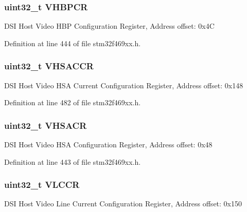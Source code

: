 \subsubsection[{\texorpdfstring{V\+H\+B\+P\+CR}{VHBPCR}}]{ uint32\+\_\+t V\+H\+B\+P\+CR}\hypertarget{struct_d_s_i___type_def_afb9fe674d72b1ec0d31697106b58b8b7}{}\label{struct_d_s_i___type_def_afb9fe674d72b1ec0d31697106b58b8b7}
D\+SI Host Video H\+BP Configuration Register, Address offset\+: 0x4C 

Definition at line 444 of file stm32f469xx.\+h.

\subsubsection[{\texorpdfstring{V\+H\+S\+A\+C\+CR}{VHSACCR}}]{ uint32\+\_\+t V\+H\+S\+A\+C\+CR}\hypertarget{struct_d_s_i___type_def_a66d476d7df8ef8e87d3da38a031567dd}{}\label{struct_d_s_i___type_def_a66d476d7df8ef8e87d3da38a031567dd}
D\+SI Host Video H\+SA Current Configuration Register, Address offset\+: 0x148 

Definition at line 482 of file stm32f469xx.\+h.

\subsubsection[{\texorpdfstring{V\+H\+S\+A\+CR}{VHSACR}}]{ uint32\+\_\+t V\+H\+S\+A\+CR}\hypertarget{struct_d_s_i___type_def_a8acb521d329627ad33515b7916b4103e}{}\label{struct_d_s_i___type_def_a8acb521d329627ad33515b7916b4103e}
D\+SI Host Video H\+SA Configuration Register, Address offset\+: 0x48 

Definition at line 443 of file stm32f469xx.\+h.

\subsubsection[{\texorpdfstring{V\+L\+C\+CR}{VLCCR}}]{ uint32\+\_\+t V\+L\+C\+CR}\hypertarget{struct_d_s_i___type_def_a205dca2d71dc6f893f9c4f22d28cba9d}{}\label{struct_d_s_i___type_def_a205dca2d71dc6f893f9c4f22d28cba9d}
D\+SI Host Video Line Current Configuration Register, Address offset\+: 0x150 

